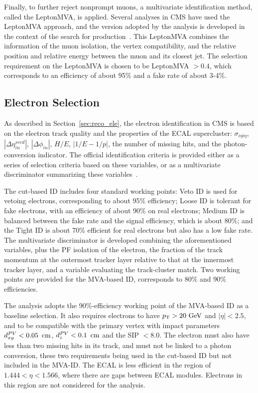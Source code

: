 Finally, to further reject nonprompt muons, a multivariate identification method, called the LeptonMVA, is applied.
Several analyses in CMS have used the LeptonMVA approach, and the version adopted by the \hmm analysis is developed in 
the context of the search for \tZq production~\cite{PhysRevLett.122.132003}.
This LeptonMVA combines the information of the muon isolation, the vertex compatibility, and the relative position and relative energy between the muon and its closest jet.
The selection requirement on the LeptonMVA is chosen to be LeptonMVA $> 0.4$, 
which corresponds to an efficiency of about 95\% and a fake rate of about 3-4\%. 

\subsection{Electron Selection}\label{sec:sel_ele}

As described in Section~\ref{sec:reco_ele}, 
the electron identification in CMS is based on the electron track quality and the properties of the ECAL supercluster:
$\sigma_{i\eta{}i\eta}$,  $|\Delta\eta^{seed}_{in}|$, $|\Delta\phi_{in}|$, $H/E$, $|1/E-1/p|$, the number of missing hits, and the photon-conversion indicator. 
The official identification criteria is provided either as a series of selection criteria based on these variables, 
or as a multivariate discriminator summarizing these variables~\cite{cmscollaboration2020electron}.

The cut-based ID includes four standard working points: 
Veto ID is used for vetoing electrons, corresponding to about 95\% efficiency;
Loose ID is tolerant for fake electrons, with an efficiency of about 90\% on real electrons;
Medium ID is balanced between the fake rate and the signal efficiency, which is about 80\%;
and the Tight ID is about 70\% efficient for real electrons but also has a low fake rate.
The multivariate discriminator is developed combining the aforementioned variables, 
plus the PF isolation of the electron, the fraction of the track momentum at the outermost tracker layer relative to that at the innermost tracker layer, 
and a variable evaluating the track-cluster match.
Two working points are provided for the MVA-based ID, corresponds to 80\% and 90\% efficiencies.

The \hmm analysis adopts the 90\%-efficiency working point of the MVA-based ID as a baseline selection.
It also requires electrons to have $p_{\mathrm{T}} > 20~\mbox{GeV}$ and $|\eta| < 2.5$, 
and to be compatible with the primary vertex with impact parameters
$d^{PV}_{xy} < 0.05~\,\text{cm}$, $d^{PV}_{z} < 0.1~\,\text{cm}$ and the SIP $< 8.0$. 
The electron must also have less than two missing hits in its track, and must not be linked to a photon conversion,
these two requirements being used in the cut-based ID but not included in the MVA-ID.
The ECAL is less efficient in the region of $1.444 < \eta < 1.566$, where there are gaps between ECAL modules.
Electrons in this region are not considered for the analysis.

